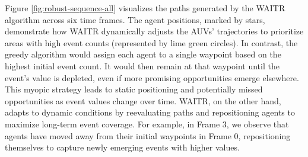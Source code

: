 \documentclass[conference]{IEEEtran}
\begin{document}
Figure \ref{fig:robust-sequence-all} visualizes the paths generated by the WAITR algorithm across six time frames. The agent positions, marked by stars, demonstrate how WAITR dynamically adjusts the AUVs' trajectories to prioritize areas with high event counts (represented by lime green circles).  In contrast, the greedy algorithm would assign each agent to a single waypoint based on the highest initial event count. It would then remain at that waypoint until the event's value is depleted, even if more promising opportunities emerge elsewhere.  This myopic strategy leads to static positioning and potentially missed opportunities as event values change over time. WAITR, on the other hand, adapts to dynamic conditions by reevaluating paths and repositioning agents to maximize long-term event coverage. For example, in Frame 3, we observe that agents have moved away from their initial waypoints in Frame 0, repositioning themselves to capture newly emerging events with higher values.


\begin{table}[h]
\centering
{}
\caption{Efficiency comparison of WAITR and Greedy planning strategies for different numbers of gliders.}
\label{tab:glider_efficiency}
\end{table}
\end{document}
